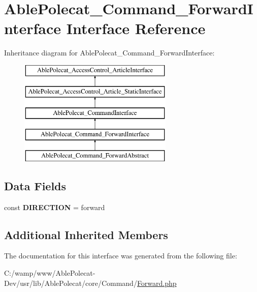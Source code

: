 \hypertarget{interface_able_polecat___command___forward_interface}{}\section{Able\+Polecat\+\_\+\+Command\+\_\+\+Forward\+Interface Interface Reference}
\label{interface_able_polecat___command___forward_interface}
Inheritance diagram for Able\+Polecat\+\_\+\+Command\+\_\+\+Forward\+Interface\+:\begin{figure}[H]
\begin{center}
\leavevmode
\includegraphics[height=5.000000cm]{interface_able_polecat___command___forward_interface}
\end{center}
\end{figure}
\subsection*{Data Fields}
\begin{DoxyCompactItemize}
\item 
\hypertarget{interface_able_polecat___command___forward_interface_ad3beabcf9bd583f082d33e2971b96b3d}{}const {\bfseries D\+I\+R\+E\+C\+T\+I\+O\+N} = \textquotesingle{}forward\textquotesingle{}\label{interface_able_polecat___command___forward_interface_ad3beabcf9bd583f082d33e2971b96b3d}

\end{DoxyCompactItemize}
\subsection*{Additional Inherited Members}


The documentation for this interface was generated from the following file\+:\begin{DoxyCompactItemize}
\item 
C\+:/wamp/www/\+Able\+Polecat-\/\+Dev/usr/lib/\+Able\+Polecat/core/\+Command/\hyperlink{_forward_8php}{Forward.\+php}\end{DoxyCompactItemize}

